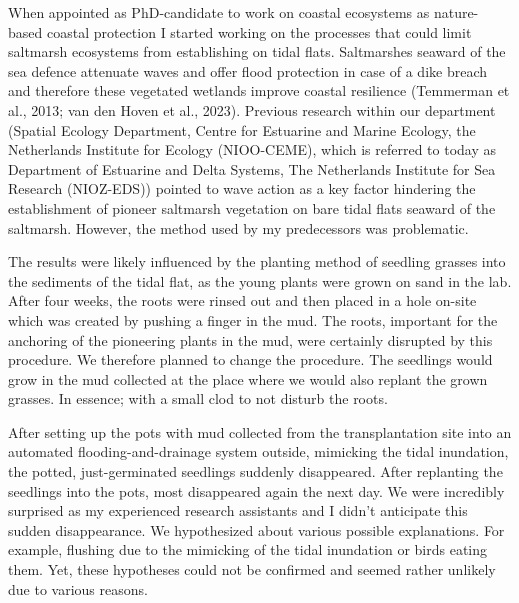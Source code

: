 \documentclass[authordate, anecdote]{jote-new-article}
\author[1]{\mbox{Jim van Belzen\orcid{0000-0003-2099-1545}}}
\affil[1]{Wageningen Marine Research (WMR) \& Department of Estuarine and Delta Systems (EDS), Royal Netherlands Institute for Sea Research (NIOZ)}
\begin{document}
\begin{frontmatter}
  \maketitle
  \begin{abstract}
    \printabstracttext
  \end{abstract}
\end{frontmatter}





	When appointed as PhD-candidate to work on coastal ecosystems as nature-based coastal protection I started working on the processes that could limit saltmarsh ecosystems from establishing on tidal flats. Saltmarshes seaward of the sea defence attenuate waves and offer flood protection in case of a dike breach and therefore these vegetated wetlands improve coastal resilience (Temmerman et al., 2013; van den Hoven et al., 2023). Previous research within our department (Spatial Ecology Department, Centre for Estuarine and Marine Ecology, the Netherlands Institute for Ecology (NIOO-CEME), which is referred to today as Department of Estuarine and Delta Systems, The Netherlands Institute for Sea Research (NIOZ-EDS)) pointed to wave action as a key factor hindering the establishment of pioneer saltmarsh vegetation on bare tidal flats seaward of the saltmarsh. However, the method used by my predecessors was problematic.



	The results were likely influenced by the planting method of seedling grasses into the sediments of the tidal flat, as the young plants were grown on sand in the lab. After four weeks, the roots were rinsed out and then placed in a hole on-site which was created by pushing a finger in the mud. The roots, important for the anchoring of the pioneering plants in the mud, were certainly disrupted by this procedure. We therefore planned to change the procedure. The seedlings would grow in the mud collected at the place where we would also replant the grown grasses. In essence; with a small clod to not disturb the roots.



	After setting up the pots with mud collected from the transplantation site into an automated flooding-and-drainage system outside, mimicking the tidal inundation, the potted, just-germinated seedlings suddenly disappeared. After replanting the seedlings into the pots, most disappeared again the next day. We were incredibly surprised as my experienced research assistants and I didn't anticipate this sudden disappearance. We hypothesized about various possible explanations. For example, flushing due to the mimicking of the tidal inundation or birds eating them. Yet, these hypotheses could not be confirmed and seemed rather unlikely due to various reasons.
\end{document}
